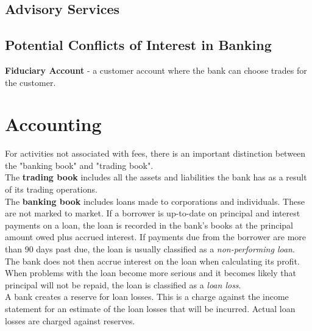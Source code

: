 \subsection{Advisory Services}

\subsection{Potential Conflicts of Interest in Banking}

\textbf{\color{blue}Fiduciary Account} - a customer account where the bank can choose trades for the customer.

\section{Accounting}
For activities not associated with fees, there is an important distinction between the "banking book" and "trading book".\\
The \textbf{\color{blue}trading book} includes all the assets and liabilities the bank has as a result of its trading operations.\\
The \textbf{\color{blue}banking book} includes loans made to corporations and individuals. These are not marked to market. If a borrower is up-to-date on principal and interest payments on a loan, the loan is recorded in the bank's books at the principal amount owed plus accrued interest. If payments due from the borrower are more than 90 days past due, the loan is usually classified as a \textit{\color{blue}non-performing loan}. The bank does not then accrue interest on the loan when calculating its profit. When problems with the loan become more serious and it becomes likely that principal will not be repaid, the loan is classified as a \textit{\color{blue}loan loss}.\\
A bank creates a reserve for loan losses. This is a charge against the income statement for an estimate of the loan losses that will be incurred. Actual loan losses are charged against reserves.

